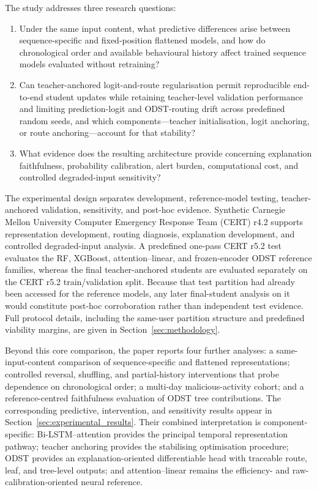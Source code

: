 \smallskip
The study addresses three research questions:
\begin{enumerate}
    \item[\textbf{RQ1:}] Under the same input content, what predictive
    differences arise between sequence-specific and fixed-position
    flattened models, and how do chronological order and available
    behavioural history affect trained sequence models evaluated without
    retraining?
    \item[\textbf{RQ2:}] Can teacher-anchored logit-and-route
    regularisation permit reproducible end-to-end student updates while
    retaining teacher-level validation performance and limiting
    prediction-logit and ODST-routing drift across predefined random seeds,
    and which components---teacher initialisation, logit anchoring, or route
    anchoring---account for that stability?
    \item[\textbf{RQ3:}] What evidence does the resulting architecture
    provide concerning explanation faithfulness, probability calibration,
    alert burden, computational cost, and controlled degraded-input
    sensitivity?
\end{enumerate}

\smallskip
The experimental design separates development, reference-model testing,
teacher-anchored validation, sensitivity, and post-hoc evidence. Synthetic
Carnegie Mellon University Computer Emergency Response Team (CERT) r4.2
supports representation development, routing diagnosis, explanation
development, and controlled degraded-input analysis. A predefined one-pass
CERT r5.2 test evaluates the RF, XGBoost, attention--linear, and
frozen-encoder ODST reference families, whereas the final teacher-anchored
students are evaluated separately on the CERT r5.2 train/validation split.
Because that test partition had already been accessed for the reference
models, any later final-student analysis on it would constitute post-hoc
corroboration rather than independent test evidence. Full protocol details,
including the same-user partition structure and predefined viability
margins, are given in Section~\ref{sec:methodology}.

\smallskip
Beyond this core comparison, the paper reports four further analyses: a
same-input-content comparison of sequence-specific and flattened
representations; controlled reversal, shuffling, and partial-history
interventions that probe dependence on chronological order; a multi-day
malicious-activity cohort; and a reference-centred faithfulness evaluation
of ODST tree contributions. The corresponding predictive, intervention, and
sensitivity results appear in Section~\ref{sec:experimental_results}. Their
combined interpretation is component-specific: Bi-LSTM--attention provides
the principal temporal representation pathway; teacher anchoring provides
the stabilising optimisation procedure; ODST provides an
explanation-oriented differentiable head with traceable route, leaf, and
tree-level outputs; and attention--linear remains the efficiency- and
raw-calibration-oriented neural reference.

